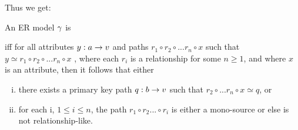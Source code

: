 Thus we get:

\begin{definition} 
An ER model $\gamma$ is  \begin{newtt}
iff for all attributes $y:a \rightarrow v$ and paths $r_1 \circ r_2 \circ ... r_n \circ x$
such that $y \simeq r_1 \circ r_2 \circ ... r_n \circ x$ ,  where each $r_i$ is a relationship for some $n \geq 1$, and where $x$ is an attribute, then
it follows that either
\begin{enumerate} [(i)]
\item there exists a primary key path $q:b \rightarrow v$ such that $r_2 \circ ... r_n \circ x \simeq q$, or
\item for each i, $1 \leq i \leq n$, the path $r_1 \circ r_2 ... \circ r_i$ is either a mono-source or else is not relationship-like.
\end{enumerate}
\end{newtt}
\end{definition}


